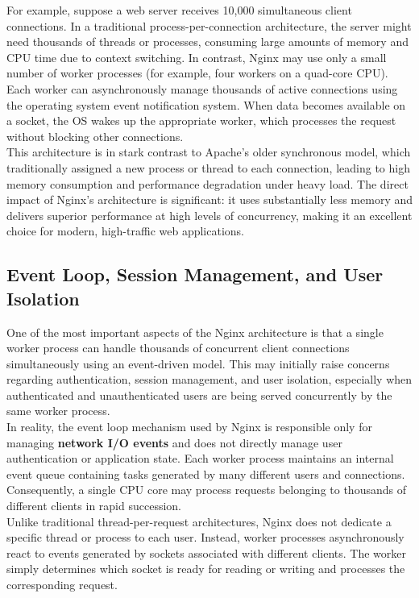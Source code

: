 \documentclass{scrbook}
\begin{document}
	For example, suppose a web server receives 10,000 simultaneous client connections. In a traditional process-per-connection architecture, the server might need thousands of threads or processes, consuming large amounts of memory and CPU time due to context switching. In contrast, Nginx may use only a small number of worker processes (for example, four workers on a quad-core CPU). Each worker can asynchronously manage thousands of active connections using the operating system event notification system. When data becomes available on a socket, the OS wakes up the appropriate worker, which processes the request without blocking other connections.\\
	
	This architecture is in stark contrast to Apache's older synchronous model, which traditionally assigned a new process or thread to each connection, leading to high memory consumption and performance degradation under heavy load. The direct impact of Nginx's architecture is significant: it uses substantially less memory and delivers superior performance at high levels of concurrency, making it an excellent choice for modern, high-traffic web applications.
	
	\subsection{Event Loop, Session Management, and User Isolation}
	
	One of the most important aspects of the Nginx architecture is that a single worker process can handle thousands of concurrent client connections simultaneously using an event-driven model. This may initially raise concerns regarding authentication, session management, and user isolation, especially when authenticated and unauthenticated users are being served concurrently by the same worker process.\\
	
	In reality, the event loop mechanism used by Nginx is responsible only for managing \textbf{network I/O events} and does not directly manage user authentication or application state. Each worker process maintains an internal event queue containing tasks generated by many different users and connections. Consequently, a single CPU core may process requests belonging to thousands of different clients in rapid succession.\\
	
	Unlike traditional thread-per-request architectures, Nginx does not dedicate a specific thread or process to each user. Instead, worker processes asynchronously react to events generated by sockets associated with different clients. The worker simply determines which socket is ready for reading or writing and processes the corresponding request.\\
	
\end{document}
